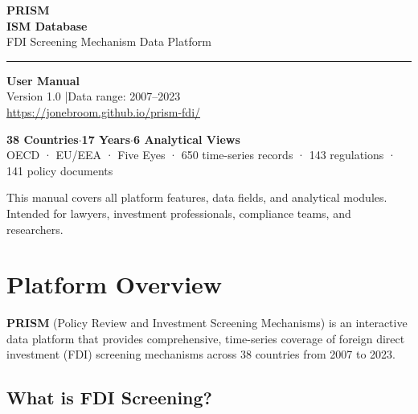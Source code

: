 \documentclass[12pt,a4paper]{article}
\begin{document}
\begin{titlepage}
  \centering
  \vspace*{3cm}

  {\Huge\bfseries\color{prismclay} PRISM}\\[0.4em]
  {\LARGE\bfseries\color{darkink} ISM Database}\\[0.6em]
  {\large\color{gray} FDI Screening Mechanism Data Platform}

  \vspace{1.5cm}
  \color{midgray}\rule{0.5\linewidth}{1pt}\color{black}
  \vspace{1.5cm}

  {\Large\bfseries User Manual}\\[0.8em]
  {\normalsize Version 1.0 \quad|\quad Data range: 2007--2023}\\[0.4em]
  {\normalsize \url{https://jonebroom.github.io/prism-fdi/}}

  \vspace{2cm}
  \begin{keybox}
    \centering
    \textbf{38 Countries}\quad $\cdot$\quad \textbf{17 Years}\quad $\cdot$\quad \textbf{6 Analytical Views}\\
    \small OECD · EU/EEA · Five Eyes · 650 time-series records · 143 regulations · 141 policy documents
  \end{keybox}

  \vfill
  {\small\color{gray} This manual covers all platform features, data fields, and analytical modules.\\
  Intended for lawyers, investment professionals, compliance teams, and researchers.}
\end{titlepage}

\tableofcontents
\newpage

\section{Platform Overview}
\label{sec:overview}

\textbf{PRISM} (Policy Review and Investment Screening Mechanisms) is an interactive data platform that provides comprehensive, time-series coverage of foreign direct investment (FDI) screening mechanisms across 38 countries from 2007 to 2023.

\subsection{What is FDI Screening?}
\end{document}
